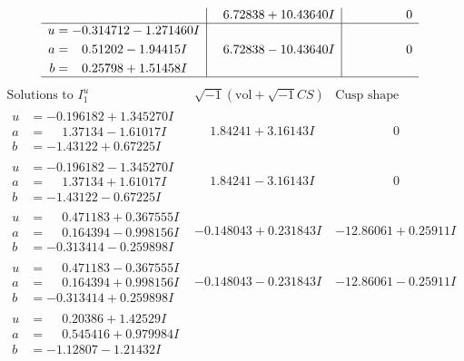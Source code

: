 \documentclass[1p]{elsarticle_modified}
\theoremstyle{definition}
\newcommand{\I}{\sqrt{-1}}
\begin{document}
$$\begin{array}{c|c|c}
 & \phantom{-}6.72838 + 10.43640 I & \phantom{-0.000000 } 0 \\ \hline\begin{aligned}
u &= -0.314712 - 1.271460 I \\
a &= \phantom{-}0.51202 - 1.94415 I \\
b &= \phantom{-}0.25798 + 1.51458 I\end{aligned}
 & \phantom{-}6.72838 - 10.43640 I & \phantom{-0.000000 } 0\\
 \hline 
 \end{array}$$\newpage$$\begin{array}{c|c|c}  
\text{Solutions to }I^u_{1}& \I (\text{vol} + \sqrt{-1}CS) & \text{Cusp shape}\\
 \hline 
\begin{aligned}
u &= -0.196182 + 1.345270 I \\
a &= \phantom{-}1.37134 - 1.61017 I \\
b &= -1.43122 + 0.67225 I\end{aligned}
 & \phantom{-}1.84241 + 3.16143 I & \phantom{-0.000000 } 0 \\ \hline\begin{aligned}
u &= -0.196182 - 1.345270 I \\
a &= \phantom{-}1.37134 + 1.61017 I \\
b &= -1.43122 - 0.67225 I\end{aligned}
 & \phantom{-}1.84241 - 3.16143 I & \phantom{-0.000000 } 0 \\ \hline\begin{aligned}
u &= \phantom{-}0.471183 + 0.367555 I \\
a &= \phantom{-}0.164394 - 0.998156 I \\
b &= -0.313414 - 0.259898 I\end{aligned}
 & -0.148043 + 0.231843 I & -12.86061 + 0.25911 I \\ \hline\begin{aligned}
u &= \phantom{-}0.471183 - 0.367555 I \\
a &= \phantom{-}0.164394 + 0.998156 I \\
b &= -0.313414 + 0.259898 I\end{aligned}
 & -0.148043 - 0.231843 I & -12.86061 - 0.25911 I \\ \hline\begin{aligned}
u &= \phantom{-}0.20386 + 1.42529 I \\
a &= \phantom{-}0.545416 + 0.979984 I \\
b &= -1.12807 - 1.21432 I\end{aligned}

\end{array}$$
\end{document}
